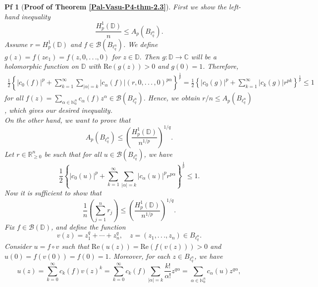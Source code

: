 \documentclass[10pt,a4paper]{amsart}
\newtheorem{pf}{Pf}
\begin{document}
\begin{pf} [{\bf Proof of Theorem \ref{Pal-Vasu-P4-thm-2.3}}]
	First we show the left-hand inequality
	\begin{equation*}
		\frac{H^1_p(\mathbb{D})}{n}\leq A_p\left(B_{\ell^n_q}\right).
	\end{equation*}
	Assume $r=H^1_p(\mathbb{D})$ and $f\in \mathcal{B}(B_{\ell^n_q})$. We define $g(z)=f(ze_1)=f(z,0,.\,.\,.,0)$ for $z\in \mathbb{D}.$ Then $g:\mathbb{D}\rightarrow\mathbb{C}$ will be a holomorphic function on $\mathbb{D}$ with $\mbox{Re}(g(z))>0$ and $g(0)=1$. Therefore,
	\begin{align*}
		\frac{1}{2}\left\{|c_0(f)|^p+\sum_{k=1}^{\infty}\sum_{|\alpha|=k}|c_{\alpha}(f)|(r,0,.\,.\,.\,,0)^{p\alpha}\right\}^{\frac{1}{p}}= \frac{1}{2}\left\{|c_0(g)|^p+\sum_{k=1}^{\infty}|c_{k}(g)|r^{pk}\right\}^{\frac{1}{p}}\leq 1
	\end{align*}
	for all $f(z)=\sum_{\alpha\in \mathbb{N}^n_{0}}c_{\alpha}(f)z^{\alpha} \in \mathcal{B}(B_{\ell^n_q})$. Hence, we obtain $r/n\leq A_p(B_{\ell^n_q})$, which gives our desired inequality.\\[2mm]
	On the other hand, we want to prove that 
	\begin{equation*}
		A_p\left(B_{\ell^n_q}\right)\leq \left(\frac{H^1_p(\mathbb{D})}{n^{1/p}}\right)^{1/q}.
	\end{equation*}
	Let $r\in \mathbb{R}^n_{\geq 0}$ be such that for all $u\in \mathcal{B}(B_{\ell^n_q})$, we have
	\begin{equation*}
		\frac{1}{2}\left\{|c_0(u)|^p + \sum_{k=1}^{\infty}\sum_{|\alpha|=k}|c_{\alpha}(u)|^pr^{p\alpha}\right\}^{\frac{1}{p}}\leq 1.
	\end{equation*}
	Now it is sufficient to show that
	\begin{equation}\label{Pal-Vasu-P4-e-3.5}
		\frac{1}{n}\left(\sum_{j=1}^{n}r_j\right) \leq  \left(\frac{H^1_p(\mathbb{D})}{n^{1/p}}\right)^{1/q}.
	\end{equation}
	Fix $f\in \mathcal{B}(\mathbb{D})$, and define the function
	\begin{equation*}
		v(z)=z^q_1+\cdots+z^q_n, \quad z=(z_1,.\,.\,.,z_n)\in B_{\ell^n_q}. 
	\end{equation*}
	 Consider $u=f\circ v$ such that $\mbox{Re}(u(z))=\mbox{Re}(f(v(z)))>0$ and $u(0)=f(v(0))=f(0)=1$. Moreover, for each $z\in B_{\ell^n_q}$, we have 
	\begin{equation*}
		u(z)=\sum_{k=0}^{\infty}c_{k}(f)v(z)^k=\sum_{k=0}^{\infty}c_k(f)\sum_{|\alpha|=k}\frac{k!}{\alpha!}z^{q\alpha}=\sum_{\alpha\in \mathbb{N}^n_{0}}c_{\alpha}(u)z^{q\alpha},

\end{equation*}
\end{pf}
\end{document}
